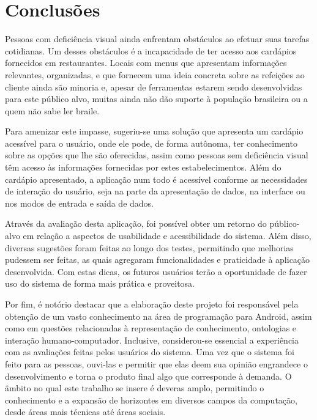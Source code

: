 \chapter{\label{chap:conclu}Conclusões}

Pessoas com deficiência visual ainda enfrentam obstáculos ao efetuar suas tarefas cotidianas. Um desses obstáculos é a incapacidade de ter acesso aos cardápios fornecidos em restaurantes. Locais com menus que apresentam informações relevantes, organizadas, e que fornecem uma ideia concreta sobre as refeições ao cliente ainda são minoria e, apesar de ferramentas estarem sendo desenvolvidas para este público alvo, muitas ainda não dão suporte à população brasileira ou a quem não sabe ler braile.

Para amenizar este impasse, sugeriu-se uma solução que apresenta um cardápio acessível para o usuário, onde ele pode, de forma autônoma, ter conhecimento sobre as opções que lhe são oferecidas, assim como pessoas sem deficiência visual têm acesso às informações fornecidas por estes estabelecimentos. Além do cardápio apresentado, a aplicação num todo é acessível conforme as necessidades de interação do usuário, seja na parte da apresentação de dados, na interface ou nos modos de entrada e saída de dados.

\color{blue}
Através da avaliação desta aplicação, foi possível obter um retorno do público-alvo em relação a aspectos de usabilidade e acessibilidade do sistema. Além disso, diversas sugestões foram feitas ao longo dos testes, permitindo que melhorias pudessem ser feitas, as quais agregaram funcionalidades e praticidade à aplicação desenvolvida. Com estas dicas, os futuros usuários terão a oportunidade de fazer uso do sistema de forma mais prática e proveitosa.

Por fim, é notório destacar que a elaboração deste projeto foi responsável pela obtenção de um vasto conhecimento na área de programação para Android, assim como em questões relacionadas à representação de conhecimento, ontologias e interação humano-computador. Inclusive, considerou-se essencial a experiência com as avaliações feitas pelos usuários do sistema. Uma vez que o sistema foi feito para as pessoas, ouvi-las e permitir que elas deem sua opinião engrandece o desenvolvimento e torna o produto final algo que corresponde à demanda. O âmbito no qual este trabalho se insere é deveras amplo, permitindo o conhecimento e a expansão de horizontes em diversos campos da computação, desde áreas mais técnicas até áreas sociais. 

